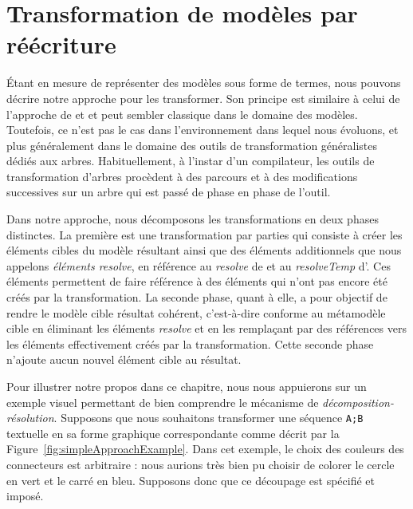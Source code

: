 \FloatBarrier

\section{Transformation de modèles par réécriture}
\label{approach:sec:approche}


Étant en mesure de représenter des modèles sous forme de termes, nous pouvons
décrire notre approche pour les transformer. Son principe est similaire à celui
de l'approche de {\qvt} et {\atl} et peut sembler classique dans le domaine des
modèles. Toutefois, ce n'est pas le cas dans l'environnement dans lequel nous
évoluons, et plus généralement dans le domaine des outils de transformation
généralistes dédiés aux arbres. Habituellement, à l'instar d'un compilateur, les
outils de transformation d'arbres procèdent à des parcours et à des
modifications successives sur un arbre qui est passé de phase en phase de
l'outil.

Dans notre approche, nous décomposons les transformations en deux phases
distinctes. La première est une transformation par parties qui consiste à créer
les éléments cibles du modèle résultant ainsi que des éléments additionnels que
nous appelons \emph{éléments resolve}, en référence au \emph{resolve} de {\qvt}
et au \emph{resolveTemp} d'{\atl}. Ces éléments permettent de faire référence à
des éléments qui n'ont pas encore été créés par la transformation. La seconde
phase, quant à elle, a pour objectif de rendre le modèle cible résultat
cohérent, c'est-à-dire conforme au métamodèle cible en éliminant les éléments
\emph{resolve} et en les remplaçant par des références vers les éléments
effectivement créés par la transformation. Cette seconde phase n'ajoute aucun
nouvel élément cible au résultat.

Pour illustrer notre propos dans ce chapitre, nous nous appuierons sur un
exemple visuel permettant de bien comprendre le mécanisme de
\emph{décomposition-résolution}. Supposons que nous souhaitons transformer une
séquence \texttt{A;B} textuelle en sa forme graphique correspondante comme
décrit par la Figure~\ref{fig:simpleApproachExample}. Dans cet exemple, le
choix des couleurs des connecteurs est arbitraire : nous aurions très bien pu
choisir de colorer le cercle en vert et le carré en bleu. Supposons donc que ce
découpage est spécifié et imposé.

